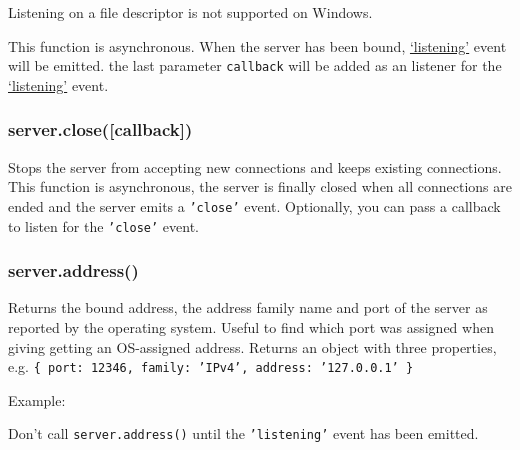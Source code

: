 Listening on a file descriptor is not supported on Windows.

This function is asynchronous. When the server has been bound,
\hyperref[event_listening_]{`listening'} event will be emitted. the
last parameter \texttt{callback} will be added as an listener for the
\hyperref[event_listening_]{`listening'} event.

\subsubsection{server.close({[}callback{]})}

Stops the server from accepting new connections and keeps existing
connections. This function is asynchronous, the server is finally closed
when all connections are ended and the server emits a \texttt{'close'}
event. Optionally, you can pass a callback to listen for the
\texttt{'close'} event.

\subsubsection{server.address()}

Returns the bound address, the address family name and port of the
server as reported by the operating system. Useful to find which port
was assigned when giving getting an OS-assigned address. Returns an
object with three properties, e.g.
\texttt{\{ port: 12346, family: 'IPv4', address: '127.0.0.1' \}}

Example:

\begin{Shaded}
\end{Shaded}

Don't call \texttt{server.address()} until the \texttt{'listening'}
event has been emitted.

